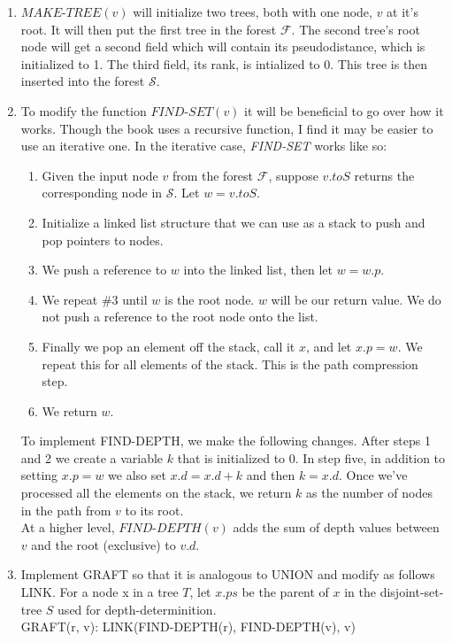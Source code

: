 \documentclass[letterpaper,10pt]{article}
\begin{document}
\begin{enumerate}
\begin{enumerate}
    \item $\textit{MAKE-TREE}(v)$ will initialize two trees, both with one node, $v$ at it's root. It will then put the first tree in the forest $\mathcal{F}$. The second tree's root node will get a second field which will contain its pseudodistance, which is initialized to 1. The third field, its rank, is intialized to 0. This tree is then inserted into the forest $\mathcal{S}$.
    \item To modify the function $\textit{FIND-SET}(v)$ it will be beneficial to go over how it works. Though the book uses a recursive function, I find it may be easier to use an iterative one. In the iterative case, \textit{FIND-SET} works like so:
    \begin{enumerate}[1.]
      \item Given the input node $v$ from the forest $\mathcal{F}$, suppose $v.toS$ returns the corresponding node in $\mathcal{S}$. Let $w = v.toS$. 
      \item Initialize a linked list structure that we can use as a stack to push and pop pointers to nodes. 
      \item We push a reference to $w$ into the linked list, then let $w = w.p$.
      \item We repeat \#3 until $w$ is the root node. $w$ will be our return value. We do not push a reference to the root node onto the list.
      \item Finally we pop an element off the stack, call it $x$, and let $x.p = w$. We repeat this for all elements of the stack. This is the path compression step.
      \item We return $w$.
    \end{enumerate}
    To implement FIND-DEPTH, we make the following changes. After steps 1 and 2 we create a variable $k$ that is initialized to 0.  In step five, in addition to setting $x.p = w$ we also set $x.d = x.d + k$ and then $k = x.d$. Once we've processed all the elements on the stack, we return $k$ as the number of nodes in the path from $v$ to its root. 
\\At a higher level, $\textit{FIND-DEPTH}(v)$ adds the sum of depth values between $v$ and the root (exclusive) to $v.d$.
\newpage
    \item Implement GRAFT so that it is analogous to UNION and modify as follows LINK. For a node x in a tree $T$, let $x.ps$ be the parent of $x$ in the disjoint-set-tree $S$ used for depth-determinition.
\\GRAFT(r, v): LINK(FIND-DEPTH(r), FIND-DEPTH(v), v)

\end{enumerate}
\end{enumerate}
\end{document}
